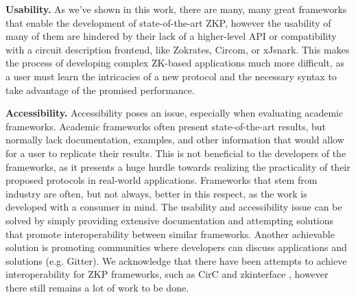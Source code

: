 \textbf{Usability.} As we've shown in this work, there are many, many great frameworks that enable the development of state-of-the-art ZKP, however the usability of many of them are hindered by their lack of a higher-level API or compatibility with a circuit description frontend, like Zokrates, Circom, or xJsnark. This makes the process of developing complex ZK-based applications much more difficult, as a user must learn the intricacies of a new protocol and the necessary syntax to take advantage of the promised performance.

\textbf{Accessibility.} Accessibility poses an issue, especially when evaluating academic frameworks. Academic frameworks often present state-of-the-art results, but normally lack documentation, examples, and other information that would allow for a user to replicate their results. This is not beneficial to the developers of the frameworks, as it presents a huge hurdle towards realizing the practicality of their proposed protocols in real-world applications. Frameworks that stem from industry are often, but not always, better in this respect, as the work is developed with a consumer in mind. The usability and accessibility issue can be solved by simply providing extensive documentation and attempting solutions that promote interoperability between similar frameworks. Another achievable solution is promoting communities where developers can discuss applications and solutions (e.g. Gitter). We acknowledge that there have been attempts to achieve interoperability for ZKP frameworks, such as CirC \cite{ozdemir2022circ} and zkinterface \cite{benarroch2019zkinterface}, however there still remains a lot of work to be done. 

